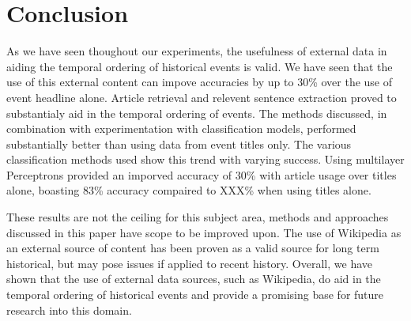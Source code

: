 \documentclass[bsc,frontabs,twoside,singlespacing,parskip,deptreport]{infthesis}     %
\begin{document}
\chapter{Conclusion}
As we have seen thoughout our experiments, the usefulness of external data in aiding the temporal ordering
of historical events is valid. We have seen that the use of this external content can impove accuracies by up to
30\% over the use of event headline alone.
Article retrieval and relevent sentence extraction proved to substantialy aid in the temporal ordering of events.
The methods discussed, in combination with experimentation with classification models, performed substantially better
than using data from event titles only.
The various classification methods used show this trend with varying success. Using multilayer Perceptrons provided an
imporved accuracy of 30\% with article usage over titles alone, boasting 83\% accuracy compaired to XXX\% when using titles
alone.


These results are not the ceiling for this subject area, methods and approaches discussed in this paper have scope
to be improved upon. The use of Wikipedia as an external source of content has been proven as a valid source for
long term historical, but may pose issues if applied to recent history. Overall, we have shown that the use of external
data sources, such as Wikipedia, do aid in the temporal ordering of historical events and provide a promising base for future
research into this domain.


\end{document}
